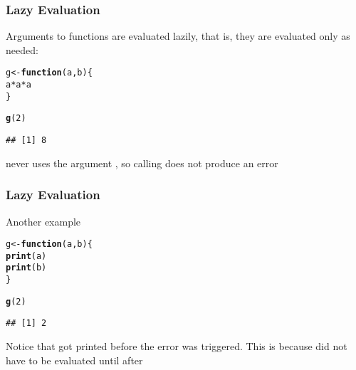 \documentclass[12pt]{beamer}\usepackage[]{graphicx}\usepackage[]{color}
\makeatletter
\newcommand{\hlnum}[1]{\textcolor[rgb]{0.686,0.059,0.569}{#1}}%
\newcommand{\hlopt}[1]{\textcolor[rgb]{0,0,0}{#1}}%
\newcommand{\hlstd}[1]{\textcolor[rgb]{0.345,0.345,0.345}{#1}}%
\newcommand{\hlkwa}[1]{\textcolor[rgb]{0.161,0.373,0.58}{\textbf{#1}}}%
\newcommand{\hlkwb}[1]{\textcolor[rgb]{0.69,0.353,0.396}{#1}}%
\newcommand{\hlkwc}[1]{\textcolor[rgb]{0.333,0.667,0.333}{#1}}%
\newcommand{\hlkwd}[1]{\textcolor[rgb]{0.737,0.353,0.396}{\textbf{#1}}}%
\newenvironment{kframe}{%
 \def\at@end@of@kframe{}%
 \ifinner\ifhmode%
  \def\at@end@of@kframe{\end{minipage}}%
  \begin{minipage}{\columnwidth}%
 \fi\fi%
 \def\FrameCommand##1{\hskip\@totalleftmargin \hskip-\fboxsep
 \colorbox{shadecolor}{##1}\hskip-\fboxsep
     \hskip-\linewidth \hskip-\@totalleftmargin \hskip\columnwidth}%
 \MakeFramed {\advance\hsize-\width
   \@totalleftmargin\z@ \linewidth\hsize
   \@setminipage}}%
 {\par\unskip\endMakeFramed%
 \at@end@of@kframe}
\newenvironment{knitrout}{}{} %
\makeatother
\begin{document}

\begin{frame}
\begin{center}
\Huge{}
\end{center}
\end{frame}


\begin{frame}[fragile]
\frametitle{Lazy Evaluation}

Arguments to functions are evaluated lazily, that is, they are evaluated only as needed:
\begin{knitrout}\footnotesize
{}\color{fgcolor}\begin{kframe}
\begin{alltt}
\hlstd{g} \hlkwb{<-} \hlkwa{function}\hlstd{(}\hlkwc{a}\hlstd{,} \hlkwc{b}\hlstd{) \{}
  \hlstd{a} \hlopt{*} \hlstd{a} \hlopt{*} \hlstd{a}
\hlstd{\}}

\hlkwd{g}\hlstd{(}\hlnum{2}\hlstd{)}
\end{alltt}
\begin{verbatim}
## [1] 8
\end{verbatim}
\end{kframe}
\end{knitrout}

 never uses the argument , so calling  does not produce an error

\end{frame}


\begin{frame}[fragile]
\frametitle{Lazy Evaluation}

Another example
\begin{knitrout}\footnotesize
{}\color{fgcolor}\begin{kframe}
\begin{alltt}
\hlstd{g} \hlkwb{<-} \hlkwa{function}\hlstd{(}\hlkwc{a}\hlstd{,} \hlkwc{b}\hlstd{) \{}
  \hlkwd{print}\hlstd{(a)}
  \hlkwd{print}\hlstd{(b)}
\hlstd{\}}

\hlkwd{g}\hlstd{(}\hlnum{2}\hlstd{)}
\end{alltt}
\begin{verbatim}
## [1] 2
\end{verbatim}


{\ttfamily\noindent\bfseries{}}\end{kframe}
\end{knitrout}

Notice that  got printed before the error was triggered. This is because  did not have to be evaluated until after 

\end{frame}
\end{document}
